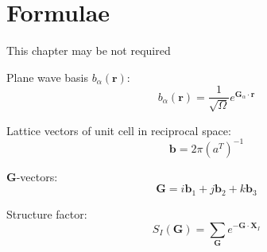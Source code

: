 \chapter{Formulae}

{\color{red} This chapter may be not required}

Plane wave basis $b_{\alpha}(\mathbf{r})$:
\begin{equation}
b_{\alpha}(\mathbf{r}) = \frac{1}{\sqrt{\Omega}} e^{\mathbf{G}_{\alpha}\cdot\mathbf{r}}
\end{equation}

Lattice vectors of unit cell in reciprocal space:
\begin{equation}\label{eq:recvecs}
\mathbf{b} = 2\pi\left( a^{T} \right)^{-1}
\end{equation}

\textbf{G}-vectors:
\begin{equation}
\mathbf{G} = i \mathbf{b}_{1} + j \mathbf{b}_{2} + k \mathbf{b}_{3}
\end{equation}

Structure factor:
\begin{equation}
S_{I}(\mathbf{G}) = \sum_{\mathbf{G}} e^{ -\mathbf{G}\cdot\mathbf{X}_{I} }
\end{equation}

